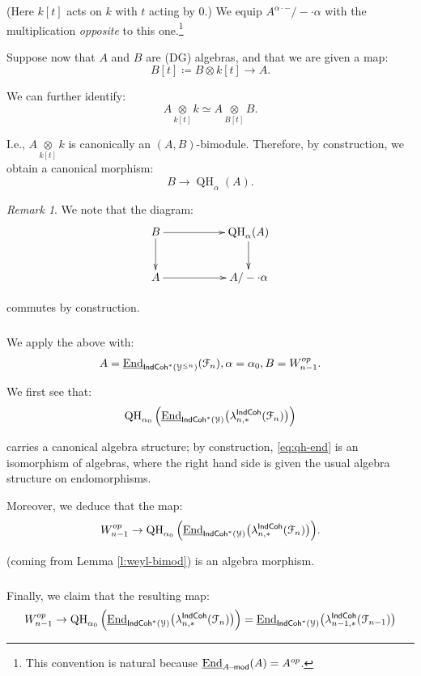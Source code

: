 \documentclass[reqno,11pt]{amsart}
\numberwithin{equation}{subsection}
\theoremstyle{remark}
\newtheorem{rem}[thm]{Remark}
\newcommand{\sF}{{\EuScript F}}
\newcommand{\sY}{{\EuScript Y}}
\newcommand{\on}{\operatorname}
\newcommand{\ul}{\underline}
\newcommand{\mathendash}{\text{\textendash}}
\newcommand{\End}{\on{End}}
\renewcommand{\mod}{\mathendash\mathsf{mod}}
\newcommand{\IndCoh}{\mathsf{IndCoh}}
\begin{document}
\noindent (Here $k[t]$ acts on $k$ with $t$ acting by $0$.)
We equip $A^{\alpha\cdot-}/-\cdot \alpha$ with the multiplication 
\emph{opposite} to this one.\footnote{This convention is natural 
because $\ul{\End}_{A\mod}(A) = A^{op}$.}

Suppose now that $A$ and $B$ are (DG) algebras, and that we are given a map:
%
\[
B[t] \coloneqq B \otimes k[t] \to A.
\] 

We can further identify:
%
\[
A \underset{k[t]}{\otimes} k \simeq A \underset{B[t]}{\otimes} B.
\]

\noindent I.e., $A \underset{k[t]}{\otimes} k$ is canonically 
an $(A,B)$-bimodule. Therefore, by construction, we obtain
a canonical morphism: 
%
\[
B \to \on{QH}_{\alpha}(A).
\]

\begin{rem}

We note that the diagram:
%
\[
\xymatrix{
B \ar[rr] \ar[d] && \on{QH}_{\alpha}(A)\ar[d] \\
A \ar[rr] && A/-\cdot\alpha
}
\]

\noindent commutes by construction. 

\end{rem}

\subsubsection{}

We apply the above with:
%
\[
A = \ul{\End}_{\IndCoh^*(\sY^{\leq n})}(\sF_n),
\alpha = \alpha_0, B = W_{n-1}^{op}.
\]

We first see that:
%
\[
\on{QH}_{\alpha_0}\Big(\ul{\End}_{\IndCoh^*(\sY)}\big(\lambda_{n,*}^{\IndCoh}(\sF_n)\big)\Big) 
\]

\noindent carries a canonical algebra structure; by construction, 
\eqref{eq:qh-end} is an isomorphism of algebras, where the right hand side
is given the usual algebra structure on endomorphisms. 

Moreover, we deduce that the map:
%
\[
W_{n-1}^{op} \to \on{QH}_{\alpha_0}\Big(\ul{\End}_{\IndCoh^*(\sY)}\big(\lambda_{n,*}^{\IndCoh}(\sF_n)\big)\Big).
\]

\noindent (coming from Lemma \ref{l:weyl-bimod}) is an algebra morphism.

\subsubsection{}

Finally, we claim that the resulting map:
%
\[
W_{n-1}^{op} \to \on{QH}_{\alpha_0}\Big(\ul{\End}_{\IndCoh^*(\sY)}\big(\lambda_{n,*}^{\IndCoh}(\sF_n)\big)\Big) = 
\ul{\End}_{\IndCoh^*(\sY)}\big(\lambda_{n-1,*}^{\IndCoh}(\sF_{n-1})\big)
\]
\end{document}
